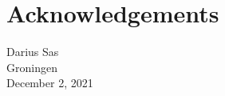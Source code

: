 \chapter*{Acknowledgements}

\begin{flushright}
Darius Sas\\
Groningen\\
December 2, 2021 %
\end{flushright}






